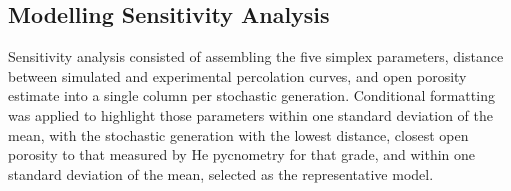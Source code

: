 \documentclass[review]{elsarticle}
\begin{document}
\subsection{Modelling Sensitivity Analysis}

Sensitivity analysis consisted of assembling the five simplex parameters,
distance between simulated and experimental percolation curves, and open
porosity estimate into a single column per stochastic generation. Conditional
formatting was applied to highlight those parameters within one standard
deviation of the mean, with the stochastic generation with the lowest
distance, closest open porosity to that measured by He pycnometry for that
grade, and within one standard deviation of the mean, selected as the
representative model.
\clearpage


\end{document}
